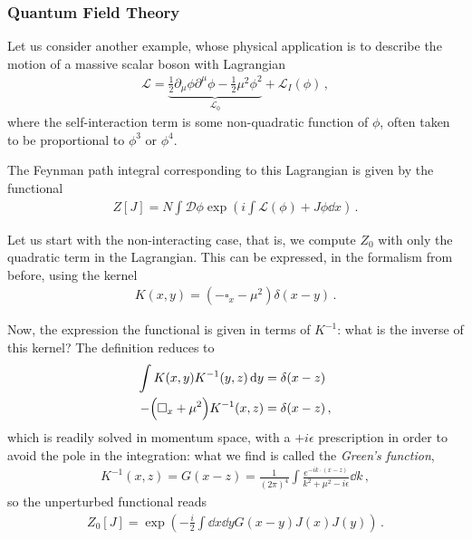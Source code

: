 \documentclass[main.tex]{subfiles}
\begin{document}
\subsubsection{Quantum Field Theory}

Let us consider another example, whose physical application is to describe the motion of a massive scalar boson with Lagrangian 
%
\begin{align}
\mathscr{L} = \underbrace{\frac{1}{2} \partial_{\mu } \phi \partial^{\mu } \phi - \frac{1}{2} \mu^2 \phi^2}_{\mathscr{L}_{0}}+ \mathscr{L}_I (\phi )
\,,
\end{align}
%
where the self-interaction term is some non-quadratic function of \(\phi \), often taken to be proportional to  \(\phi^3\)  or \(\phi^{4}\). 

The Feynman path integral corresponding to this Lagrangian is given by the functional 
%
\begin{align}
Z[J] = N \int \mathcal{D} \phi \exp(i \int \mathscr{L}(\phi ) +  J \phi \dd{x} )
\,.
\end{align}

Let us start with the non-interacting case, that is, we compute \(Z_0 \) with only the quadratic term in the Lagrangian. This can be expressed, in the formalism from before, using the kernel 
%
\begin{align}
K(x, y )= (- \square_x - \mu^2 ) \delta (x-y)
\,.
\end{align}

Now, the expression the functional is given in terms of \(K^{-1}\): what is the inverse of this kernel? The definition reduces to 
%
\begin{align}
\int K(x, y) K^{-1}(y, z) \dd{y} &= \delta (x-z)   \\
- \qty(\square_x + \mu^2) K^{-1} (x, z) &= \delta (x-z)
\,,
\end{align}
%
which is readily solved in momentum space, with a \(+i \epsilon \) prescription in order to avoid the pole in the integration: what we find is called the \emph{Green's function}, 
%
\begin{align}
K^{-1}(x, z) = G(x-z) = \frac{1}{(2 \pi )^{4}} \int \frac{e^{-ik \cdot (x-z)}}{k^2 + \mu^2 - i \epsilon } \dd{k} 
\,,
\end{align}
%
so the unperturbed functional reads 
%
\begin{align}
Z_0 [J] = \exp(- \frac{i}{2} \int \dd{x} \dd{y} G(x-y) J(x) J(y))
\,.
\end{align}

\end{document}

